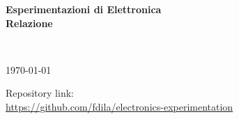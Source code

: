 \begin{titlepage}

  \begin{center}
    \vspace*{4cm}

    \huge
    \textbf{Esperimentazioni di Elettronica} \\
    \LARGE
    \vspace{0.25cm}
    \textbf{Relazione}
    
    
    \vspace{3cm}
    
    \Large
     \\
    \vspace{0.15cm}
    \vspace{2cm}
    
    \large
    \today
    \vfill
    
    \small
    Repository link: \\
    \href{https://github.com/fdila/electronics-experimentation}{https://github.com/fdila/electronics-experimentation}
    
  \end{center}

\end{titlepage}